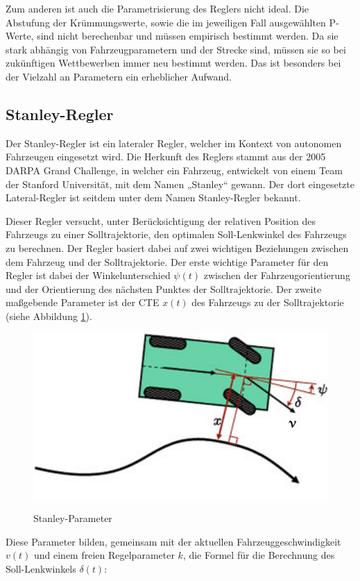Zum anderen ist auch die Parametrisierung des Reglers nicht ideal. 
Die Abstufung der Krümmungswerte, sowie die im jeweiligen Fall ausgewählten P-Werte, sind nicht berechenbar und müssen empirisch bestimmt werden.
Da sie stark abhängig von Fahrzeugparametern und der Strecke sind, müssen sie so bei zukünftigen Wettbewerben immer neu bestimmt werden.
Das ist besonders bei der Vielzahl an Parametern ein erheblicher Aufwand.

\subsection{Stanley-Regler}

Der Stanley-Regler ist ein lateraler Regler, welcher im Kontext von autonomen Fahrzeugen eingesetzt wird. Die Herkunft des Reglers stammt aus der 2005 DARPA Grand Challenge, in welcher ein Fahrzeug, entwickelt von einem Team der Stanford Universität, mit dem Namen „Stanley“ gewann.\cite{stanley_DARPA_grand_challange} Der dort eingesetzte Lateral-Regler ist seitdem unter dem Namen Stanley-Regler bekannt.

Dieser Regler versucht, unter Berücksichtigung der relativen Position des Fahrzeugs zu einer Solltrajektorie, den optimalen Soll-Lenkwinkel des Fahrzeugs zu berechnen. Der Regler basiert dabei auf zwei wichtigen Beziehungen zwischen dem Fahrzeug und der Solltrajektorie.
Der erste wichtige Parameter für den Regler ist dabei der Winkelunterschied \(\psi(t)\) zwischen der Fahrzeugorientierung und der Orientierung des nächsten Punktes der Solltrajektorie. Der zweite maßgebende Parameter ist der \gls{CTE} \(x(t)\) des Fahrzeugs zu der Solltrajektorie (siehe Abbildung \ref{fig:stanley_parameter}).\cite{stanley_DARPA_grand_challange}  

\begin{figure}[H]
    \centering
    \includegraphics[width=0.5\linewidth]{Pictures/stanleySkizze.png}
    \caption{Stanley-Parameter}
    \cite{stanley_DARPA_grand_challange}
    \label{fig:stanley_parameter}
\end{figure}

Diese Parameter bilden, gemeinsam mit der aktuellen Fahrzeuggeschwindigkeit \(v(t)\) und einem freien Regelparameter \(k\), die Formel für die Berechnung des Soll-Lenkwinkels \(\delta(t)\): \cite{stanley_DARPA_grand_challange}

